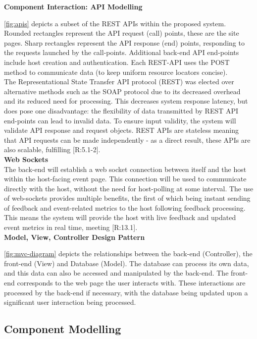 \documentclass[9pt, titlepage]{extarticle}
\begin{document}
\textbf{Component Interaction: API Modelling}

\autoref{fig:apis} depicts a subset of the REST APIs within the proposed system. Rounded rectangles represent the API request (call) points, these are the site pages. Sharp rectangles represent the API response (end) points, responding to the requests launched by the call-points. Additional back-end API end-points include host creation and authentication. Each REST-API uses the POST method to communicate data (to keep uniform resource locators concise). \\

The Representational State Transfer API protocol (REST) was elected over alternative methods such as the SOAP protocol due to its decreased overhead and its reduced need for processing. 
This decreases system response latency, but does pose one disadvantage: the flexibility of data transmitted by REST API end-points can lead to invalid data. 
To ensure input validity, the system will validate API response and request objects. REST APIs are stateless meaning that API requests can be made independently - as a direct result, these APIs are also scalable, fulfilling [R:5.1-2].\\

\textbf{Web Sockets}\\
The back-end will establish a web socket connection between itself and the host within the host-facing event page. 
This connection will be used to communicate directly with the host, without the need for host-polling at some interval.
The use of web-sockets provides multiple benefits, the first of which being instant sending of feedback and event-related metrics to the host following feedback processing.
This means the system will provide the host with live feedback and updated event metrics in real time, meeting [R:13.1].\\

\textbf{Model, View, Controller Design Pattern}

\autoref{fig:mvc-diagram} depicts the relationships between the back-end (Controller), the front-end (View) and Database (Model). The database can process its own data, and this data can also be accessed and manipulated by the back-end. The front-end corresponds to the web page the user interacts with. These interactions are processed by the back-end if necessary, with the database being updated upon a significant user interaction being processed.

\subsection{Component Modelling}
\end{document}
